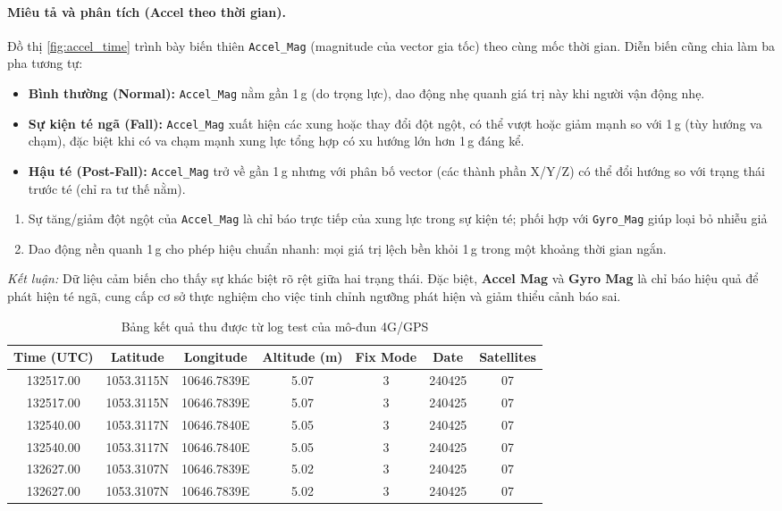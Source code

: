 \paragraph{Miêu tả và phân tích (Accel theo thời gian).}
Đồ thị \ref{fig:accel_time} trình bày biến thiên \texttt{Accel\_Mag} (magnitude của vector gia tốc) theo cùng mốc thời gian. Diễn biến cũng chia làm ba pha tương tự:
\begin{itemize}
  \item \textbf{Bình thường (Normal):} \texttt{Accel\_Mag} nằm gần 1\,g (do trọng lực), dao động nhẹ quanh giá trị này khi người vận động nhẹ.
  \item \textbf{Sự kiện té ngã (Fall):} \texttt{Accel\_Mag} xuất hiện các xung hoặc thay đổi đột ngột, có thể vượt hoặc giảm mạnh so với 1\,g (tùy hướng va chạm), đặc biệt khi có va chạm mạnh xung lực tổng hợp có xu hướng lớn hơn 1\,g đáng kể.
  \item \textbf{Hậu té (Post-Fall):} \texttt{Accel\_Mag} trở về gần 1\,g nhưng với phân bố vector (các thành phần X/Y/Z) có thể đổi hướng so với trạng thái trước té (chỉ ra tư thế nằm).
\end{itemize}

\begin{enumerate}
  \item Sự tăng/giảm đột ngột của \texttt{Accel\_Mag} là chỉ báo trực tiếp của xung lực trong sự kiện té; phối hợp với \texttt{Gyro\_Mag} giúp loại bỏ nhiễu giả   \item Dao động nền quanh 1\,g cho phép hiệu chuẩn nhanh: mọi giá trị lệch bền khỏi 1\,g trong một khoảng thời gian ngắn.
\end{enumerate}

\textit{Kết luận:} Dữ liệu cảm biến cho thấy sự khác biệt rõ rệt giữa hai trạng thái. Đặc biệt, \textbf{Accel Mag} và \textbf{Gyro Mag} là chỉ báo hiệu quả để phát hiện té ngã, cung cấp cơ sở thực nghiệm cho việc tinh chỉnh ngưỡng phát hiện và giảm thiểu cảnh báo sai.

\begin{table}[H]
\centering
\caption{Bảng kết quả thu được từ log test của mô-đun 4G/GPS}
\label{tab:gps_data}
\begin{tabular}{|c|c|c|c|c|c|c|}
\hline
\textbf{Time (UTC)} & \textbf{Latitude} & \textbf{Longitude} & \textbf{Altitude (m)} & \textbf{Fix Mode} & \textbf{Date} & \textbf{Satellites} \\
\hline
132517.00 & 1053.3115N & 10646.7839E & 5.07 & 3 & 240425 & 07 \\
132517.00 & 1053.3115N & 10646.7839E & 5.07 & 3 & 240425 & 07 \\
132540.00 & 1053.3117N & 10646.7840E & 5.05 & 3 & 240425 & 07 \\
132540.00 & 1053.3117N & 10646.7840E & 5.05 & 3 & 240425 & 07 \\
132627.00 & 1053.3107N & 10646.7839E & 5.02 & 3 & 240425 & 07 \\
132627.00 & 1053.3107N & 10646.7839E & 5.02 & 3 & 240425 & 07 \\
\hline
\end{tabular}
\end{table}



